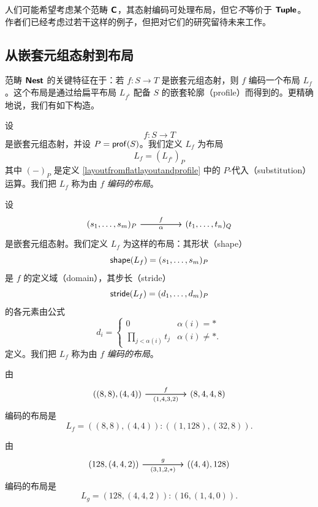 \begin{remark}
    人们可能希望考虑某个范畴 ${\boldsymbol{\mathsf{C}}}$，其态射编码可处理布局，但它{\it 不}等价于 ${\boldsymbol{\mathsf{Tuple}}}$。作者们已经考虑过若干这样的例子，但把对它们的研究留待未来工作。
\end{remark}

\subsection{从嵌套元组态射到布局}

范畴 ${\boldsymbol{\mathsf{Nest}}}$ 的关键特征在于：若 $f:S \to T$ 是嵌套元组态射，则 $f$ 编码一个布局 $L_f$。这个布局是通过给扁平布局 $L_{f^\flat}$ 配备 $S$ 的嵌套轮廓（profile）而得到的。更精确地说，我们有如下构造。

\begin{construction}\label{layoutfromnestedtuplemorphism}
    设
    \[
    f:S \to T
    \]
    是嵌套元组态射，并设 $P = \mathsf{prof}(S)$。我们定义 $L_f$
    为布局
    \[
    L_f = (L_{f^\flat})_P
    \]
    其中 $(-)_P$ 是定义 \ref{layoutfromflatlayoutandprofile} 中的 $P$-代入（substitution）运算。我们把 $L_{f}$ 称为由 $f$ {\it 编码的布局}。
\end{construction}

\begin{construction}\label{layoutfromnestedtuplemorphism}
    设
\[\begin{tikzcd} (s_1,\dots,s_m)_P \ar[rr,"f"] \ar[rr,swap,"\alpha"] & &  (t_1,\dots,t_n)_Q\end{tikzcd} \]
是嵌套元组态射。我们定义 $L_f$ 为这样的布局：其形状（shape）\[\mathsf{shape}(L_f) = (s_1,\dots,s_m)_P\]
是 $f$ 的定义域（domain），其步长（stride）\[\mathsf{stride}(L_f) = (d_1,\dots,d_m)_P\] 的各元素由公式
\[d_i = \begin{cases}
0 & \alpha(i) = * \\
\prod_{j < \alpha(i)} t_j & \alpha(i) \neq *.
\end{cases}
\]
定义。我们把 $L_f$ 称为由 $f$ {\it 编码的布局}。
\end{construction}

\begin{example}
    由
    \[ \begin{tikzcd}
    ((8,8),(4,4)) \ar[rr,"f"] \ar[rr,swap,"(1{,}4{,}3{,}2)"] & & (8,4,4,8)
    \end{tikzcd} \]
    编码的布局是
    \[
    L_f = ((8,8),(4,4)):((1,128),(32,8)).
    \]
\end{example}

\begin{example}
    由
    \[ \begin{tikzcd}
    (128,(4,4,2)) \ar[rr,"g"] \ar[rr,swap,"(3{,}1{,}2{,}*)"] & & ((4,4),128)
    \end{tikzcd} \]
    编码的布局是
    \[
    L_g = (128,(4,4,2)):(16,(1,4,0)).
    \]
\end{example}


